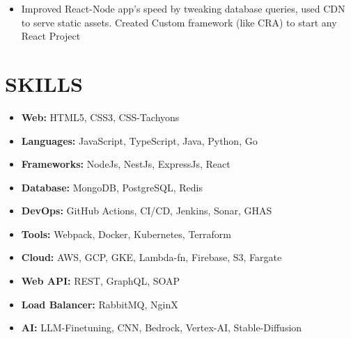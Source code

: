 \documentclass[line, margin, 12pt]{res}
\begin{document}
\begin{resume}
\begin{itemize}
\item Improved React-Node app's speed by tweaking database queries, used CDN to serve static assets. Created Custom framework (like CRA) to start any React Project
\end{itemize}


\section{SKILLS}
\begin{itemize}
\item \textbf{Web:} HTML5, CSS3, CSS-Tachyons
\item \textbf{Languages:} JavaScript, TypeScript, Java, Python, Go
\item \textbf{Frameworks:} NodeJs, NestJs, ExpressJs, React
\item \textbf{Database:} MongoDB, PostgreSQL, Redis
\item \textbf{DevOps:} GitHub Actions, CI/CD, Jenkins, Sonar, GHAS
\item \textbf{Tools:} Webpack, Docker, Kubernetes, Terraform
\item \textbf{Cloud:} AWS, GCP, GKE, Lambda-fn, Firebase, S3, Fargate
\item \textbf{Web API:} REST, GraphQL, SOAP
\item \textbf{Load Balancer:} RabbitMQ, NginX
\item \textbf{AI:} LLM-Finetuning, CNN, Bedrock, Vertex-AI, Stable-Diffusion
\end{itemize}

\end{resume}
\end{document}
